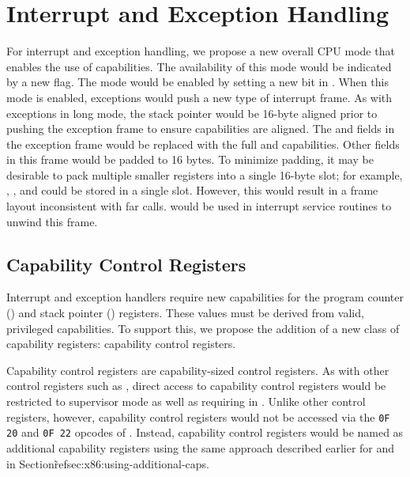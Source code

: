 \section{Interrupt and Exception Handling}
\label{sec:x86:interrupt-exception}

For interrupt and exception handling, we propose a new overall CPU
mode that enables the use of capabilities.  The availability of this
mode would be indicated by a new  flag.  The mode
would be enabled by setting a new bit in \CRFOUR{}.  When this mode is
enabled, exceptions would push a new type of interrupt frame.  As with
exceptions in long mode, the stack pointer would be 16-byte aligned
prior to pushing the exception frame to ensure capabilities are
aligned.  The \RIP{} and \RSP{} fields in the exception frame would be
replaced with the full \CIP{} and \CSP{} capabilities.  Other fields
in this frame would be padded to 16 bytes.  To minimize padding, it
may be desirable to pack multiple smaller registers into a single
16-byte slot; for example, \SS{}, \CS{}, and \RFLAGS{} could be stored
in a single slot.  However, this would result in a frame layout
inconsistent with far calls.   would be used in
interrupt service routines to unwind this frame.

\subsection{Capability Control Registers}
\label{sec:x86:capability-control-registers}

Interrupt and exception handlers require new capabilities for the
program counter (\CIP{}) and stack pointer (\CSP{}) registers.  These
values must be derived from valid, privileged capabilities.  To
support this, we propose the addition of a new class of capability
registers: capability control registers.

Capability control registers are capability-sized control registers.
As with other control registers such as \CRFOUR, direct access to
capability control registers would be restricted to supervisor mode as
well as requiring \cappermASR{} in \CIP{}.  Unlike other control
registers, however, capability control registers would not be accessed
via the \texttt{0F 20} and \texttt{0F 22} opcodes of .
Instead, capability control registers would be named as additional
capability registers using the same approach described earlier for
\CFS{} and \CGS{} in Section\~ref{sec:x86:using-additional-caps}.


